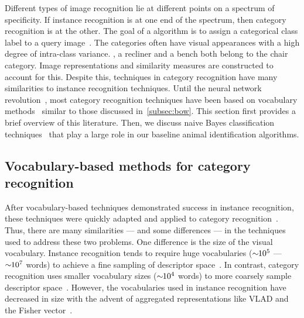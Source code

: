     Different types of image recognition lie at different points on a spectrum of specificity. If instance
    recognition is at one end of the spectrum, then category recognition is at the other. The goal of a
     algorithm is to assign a categorical class label to a query
    image~\cite{everingham_pascal_2010, everingham_pascal_2015, russakovsky_imagenet_2014, deng_imagenet_2009,
    fei_fei_one_shot_2006, griffin_caltech_256_2007}. The categories often have visual appearances with a high
    degree of intra-class variance. \Eg{}, a recliner and a bench both belong to the chair category. Image
    representations and similarity measures are constructed to account for this. Despite this, techniques in
    category recognition have many similarities to instance recognition techniques. Until the neural network
    revolution~\cite{krizhevsky_imagenet_2012}, most category recognition techniques have been based on vocabulary
    methods~\cite{csurka_visual_2004, yang_linear_2009, sanchez_compressed_2013, russakovsky_imagenet_2014,
    krizhevsky_imagenet_2012} similar to those discussed in~\cref{subsec:bow}. This section first provides a brief
    overview of this literature. Then, we discuss naive Bayes classification
    techniques~\cite{boiman_defense_2008,mccann_local_2012} that play a large role in our baseline animal
    identification algorithms.

    \subsection{Vocabulary-based methods for category recognition}
        After vocabulary-based techniques demonstrated success in instance recognition, these techniques were
        quickly adapted and applied to category recognition~\cite{csurka_visual_2004}. Thus, there are many
        similarities --- and some differences --- in the techniques used to address these two problems. One
        difference is the size of the visual vocabulary. Instance recognition tends to require huge vocabularies
        ($\sim\mkern-6mu 10^{5}$ --- $\sim\mkern-6mu 10^{7}$ words) to achieve a fine sampling of descriptor
        space~\cite{nister_scalable_2006, philbin_object_2007}. In contrast, category recognition uses smaller
        vocabulary sizes ($\sim\mkern-6mu 10^{4}$ words) to more coarsely sample descriptor
        space~\cite{zhang_local_2006}. However, the vocabularies used in instance recognition have decreased in
        size with the advent of aggregated representations like VLAD and the Fisher
        vector~\cite{arandjelovic_all_2013, sanchez_compressed_2013}.

